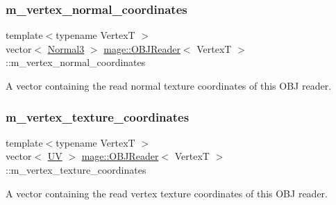\subsubsection{\texorpdfstring{m\+\_\+vertex\+\_\+normal\+\_\+coordinates}{m\_vertex\_normal\_coordinates}}
{\footnotesize\ttfamily template$<$typename VertexT $>$ \\
vector$<$ \hyperlink{structmage_1_1_normal3}{Normal3} $>$ \hyperlink{classmage_1_1_o_b_j_reader}{mage\+::\+O\+B\+J\+Reader}$<$ VertexT $>$\+::m\+\_\+vertex\+\_\+normal\+\_\+coordinates\hspace{0.3cm}{\ttfamily [private]}}

A vector containing the read normal texture coordinates of this O\+BJ reader. \hypertarget{classmage_1_1_o_b_j_reader_aec7c093d380be0b8506f7b8fdf9c3ad1}{}\label{classmage_1_1_o_b_j_reader_aec7c093d380be0b8506f7b8fdf9c3ad1} 
\subsubsection{\texorpdfstring{m\+\_\+vertex\+\_\+texture\+\_\+coordinates}{m\_vertex\_texture\_coordinates}}
{\footnotesize\ttfamily template$<$typename VertexT $>$ \\
vector$<$ \hyperlink{structmage_1_1_u_v}{UV} $>$ \hyperlink{classmage_1_1_o_b_j_reader}{mage\+::\+O\+B\+J\+Reader}$<$ VertexT $>$\+::m\+\_\+vertex\+\_\+texture\+\_\+coordinates\hspace{0.3cm}{\ttfamily [private]}}

A vector containing the read vertex texture coordinates of this O\+BJ reader. 